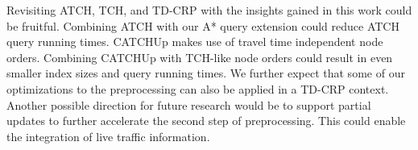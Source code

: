 \documentclass[a4paper,UKenglish,cleveref,autoref]{lipics-v2019}
\newcommand{\tdcch}{CATCHUp}
\begin{document}
Revisiting ATCH, TCH, and TD-CRP with the insights gained in this work could be fruitful.
Combining ATCH with our A* query extension could reduce ATCH query running times.
\tdcch{} makes use of travel time independent node orders.
Combining \tdcch{} with TCH-like node orders could result in even smaller index sizes and query running times.
We further expect that some of our optimizations to the preprocessing can also be applied in a TD-CRP context.
Another possible direction for future research would be to support partial updates to further accelerate the second step of preprocessing.
This could enable the integration of live traffic information.


\end{document}
